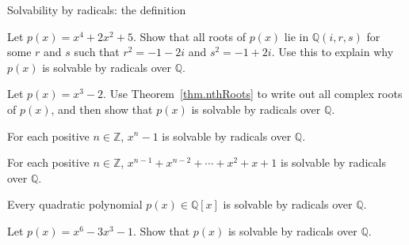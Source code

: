 \begin{section}{Solvability by radicals: the definition}
\begin{problem}
Let $p(x) = x^4+2x^2+5$. Show that all roots of $p(x)$ lie in $\mathbb{Q}\left(i,r,s\right)$ for some $r$ and $s$ such that  $r^2 = -1-2i$ and $s^2 = -1+2i$. Use this to explain why $p(x)$ is solvable by radicals over $\mathbb{Q}$.
\end{problem}

\begin{problem}
Let $p(x) = x^3 - 2$. Use Theorem~\ref{thm.nthRoots} to write out all complex roots of $p(x)$, and then show that $p(x)$ is solvable by radicals over $\mathbb{Q}$.
\end{problem}

\begin{theorem}
For each positive $n\in \mathbb{Z}$,   $ x^n - 1$ is solvable by radicals over $\mathbb{Q}$.
\end{theorem}

\begin{theorem}\label{thm.SolvableByRadicalsNontrivialRootsOf1}
For each positive $n\in \mathbb{Z}$,   $x^{n-1} + x^{n-2} + \cdots + x^2 + x + 1$ is solvable by radicals over $\mathbb{Q}$.
\end{theorem}

\begin{theorem}
Every quadratic polynomial $p(x)\in \mathbb{Q}[x]$ is solvable by radicals over $\mathbb{Q}$.
\end{theorem}

\begin{problem}\label{prob.SolvableByRadicalsHard}
Let $p(x) = x^6 - 3x^3 - 1$. Show that $p(x)$ is solvable by radicals over $\mathbb{Q}$.
\end{problem}
\end{section}








